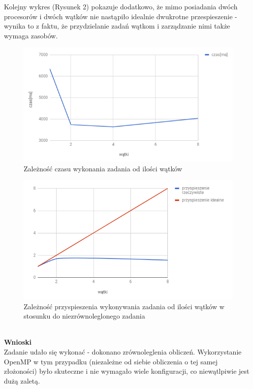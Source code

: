 \documentclass[a4paper,12pt]{article}
\begin{document}
Kolejny wykres (Rysunek 2) pokazuje dodatkowo, że mimo posiadania dwóch procesorów i dwóch wątków nie nastąpiło idealnie dwukrotne przespieszenie - wynika to z faktu, że przydzielanie zadań wątkom i zarządzanie nimi także wymaga zasobów.
\begin{figure}[h]
\includegraphics[scale=0.8]{wykres_zad1}
\caption{Zależność czasu wykonania zadania od ilości wątków}  
\end{figure}
\begin{figure}[h]
\includegraphics[scale=0.8]{wykres2_zad1}
\caption{Zależność przyspieszenia wykonywania zadania od ilości wątków w stosunku do niezrównoleglonego zadania}  
\end{figure}
\\


\textbf{Wnioski }\\
Zadanie udało się wykonać - dokonano zrównoleglenia obliczeń. Wykorzystanie OpenMP w tym przypadku (niezależne od siebie obliczenia o tej samej złożoności) było skuteczne i nie wymagało wiele konfiguracji, co niewątlpiwie jest dużą zaletą. 
\end{document}
